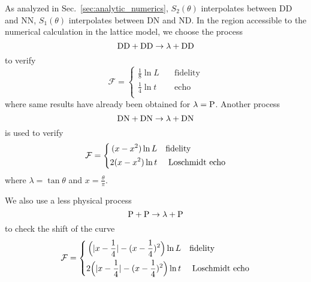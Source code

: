 As analyzed in Sec.~\ref{sec:analytic_numerics}, $S_2( \theta)$ interpolates between DD and NN, $S_1( \theta )$ interpolates between DN and ND. In the region accessible to the numerical calculation in the lattice model, we choose the process 
\begin{equation}
\label{eq:DDDD}
{\rm DD} + {\rm DD} \rightarrow  \lambda + {\rm DD}
\end{equation}
to verify
\begin{equation}
\label{eq:result_DDDD}
\mathcal{F} = 
\left\lbrace
\begin{aligned}
\frac{1}{8}\ln L  &\quad\text{fidelity}  \\
\frac{1}{4}\ln t   &\quad \text{echo}   \\
\end{aligned} \right.  
\end{equation}
where same results have already been obtained for $\lambda = {\rm P}$\cite{stephan_logarithmic_2013,stephan_local_2011,vasseur_universal_2014,vasseur_crossover_2013,kennes_universal_2014}. Another process
\begin{equation}
\label{eq:DNDN}
{\rm DN} + {\rm DN} \rightarrow \lambda + {\rm DN} 
\end{equation}
is used to verify
\begin{equation}
\label{eq:result_DNDN}
\mathcal{F} = 
\left\lbrace
\begin{aligned}
 (x - x^2 )\ln L   &  \quad {\rm fidelity} \\
 2(x - x^2 ) \ln t  & \quad \text{ Loschmidt echo} \\
\end{aligned} \right. 
\end{equation}
where $\lambda = \tan \theta$ and $x = \frac{\theta}{\pi}$. 

We also use a less physical process
\begin{equation}
  \label{eq:PP}
  {\rm P} + {\rm P} \rightarrow \lambda + {\rm P}
\end{equation}
to check the shift of the curve
\begin{equation}
\label{eq:periodic-case}
\mathcal{F} = 
\left\lbrace
\begin{aligned}
  \Big(|x-\frac{1}{4}| - (x-\frac{1}{4})^2 \Big)\ln L   &  \quad {\rm fidelity} \\
  2\Big(|x-\frac{1}{4}| - (x-\frac{1}{4})^2 \Big) \ln t  & \quad \text{ Loschmidt echo} \\
\end{aligned} \right. 
\end{equation}



